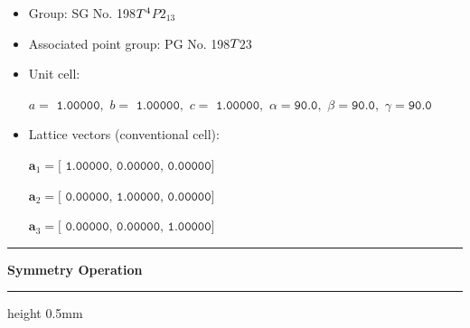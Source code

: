 \documentclass[fleqn,10pt,landscape]{jsarticle}
\begin{document}
\begin{itemize}
\item Group: SG No. 198\quad$T_{\rm }^{4}$\quad$P2_13$\quad[ cubic ]
\item Associated point group: PG No. 198\quad$T_{\rm }$\quad$23$\quad[ cubic ]
\end{itemize}
\begin{itemize}
\item Unit cell:

\quad $a=\texttt{ 1.00000},\,\, b=\texttt{ 1.00000},\,\, c=\texttt{ 1.00000},\,\, \alpha=\texttt{90.0},\,\, \beta=\texttt{90.0},\,\, \gamma=\texttt{90.0}$

\item Lattice vectors (conventional cell):

\quad $\bm{a}_1=\texttt{[ 1.00000, 0.00000, 0.00000]}$

\quad $\bm{a}_2=\texttt{[ 0.00000, 1.00000, 0.00000]}$

\quad $\bm{a}_3=\texttt{[ 0.00000, 0.00000, 1.00000]}$

\end{itemize}
\vspace{5mm}
\noindent \rule[0.5mm]{5mm}{0.5mm}\hspace{3mm}\textbf{Symmetry Operation}\hspace{3mm}\leaders\hrule height 0.5mm\hfill\kern0pt
\vspace{3mm}
\end{document}
